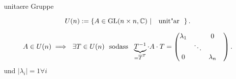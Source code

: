 \documentclass[class=article, crop=false]{standalone}
\begin{document}
\begin{zettel}{unitaere Gruppe}
\begin{flashcard}
	\[
		U (n) := \set{A \in  \GL(n \times n,\C )}{\tx{ unit"ar } }
	.\]
\end{flashcard}
\begin{corollary}
	\[
		A \in  U(n) \implies  \exists  T \in  U(n) \tx{ sodass } \underbrace{T^{-1}}_{ = \bar{T}^T} \cdot  A \cdot  T =
		\begin{pmatrix}
			\lambda_1 &        & 0           \\
			          & \ddots &           & \\
			0         &        & \lambda_n   \\
		\end{pmatrix}
	.\]
	und $ |\lambda_i| = 1 \forall i$
\end{corollary}
\end{zettel}
\end{document}
